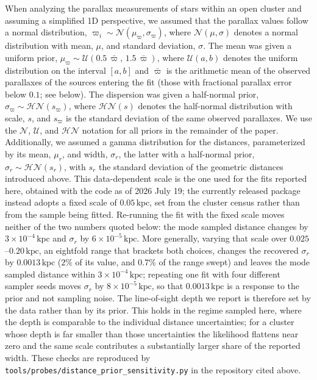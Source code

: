 \documentclass{aa}
\begin{document}
When analyzing the parallax measurements of stars within an open cluster and assuming a simplified 1D perspective, we assumed that the parallax values follow a normal distribution, $\varpi_i \sim \mathcal{N}(\mu_\varpi,\sigma_\varpi)$, where $\mathcal{N}(\mu,\sigma)$ denotes a normal distribution with mean, $\mu$, and standard deviation, $\sigma$. The mean was given a uniform prior, $\mu_\varpi \sim \mathcal{U}(0.5\,\bar{\varpi},\,1.5\,\bar{\varpi})$, where $\mathcal{U}(a,b)$ denotes the uniform distribution on the interval $[a,b]$ and $\bar{\varpi}$ is the arithmetic mean of the observed parallaxes of the sources entering the fit (those with fractional parallax error below $0.1$; see below). The dispersion was given a half-normal prior, $\sigma_\varpi \sim \mathcal{HN}(s_\varpi)$, where $\mathcal{HN}(s)$ denotes the half-normal distribution with scale, $s$, and $s_\varpi$ is the standard deviation of the same observed parallaxes. We use the $\mathcal{N}$, $\mathcal{U}$, and $\mathcal{HN}$ notation for all priors in the remainder of the paper. Additionally, we assumed a gamma distribution for the distances, parameterized by its mean, $\mu_r$, and width, $\sigma_r$, the latter with a half-normal prior, $\sigma_r \sim \mathcal{HN}(s_r)$, with $s_r$ the standard deviation of the geometric distances introduced above. This data-dependent scale is the one used for the fits reported here, obtained with the code as of 2026 July 19; the currently released package instead adopts a fixed scale of $0.05\,\mathrm{kpc}$, set from the \citet{2024arXiv240305143H} cluster census rather than from the sample being fitted. Re-running the fit with the fixed scale moves neither of the two numbers quoted below: the mode sampled distance changes by $3\times10^{-4}\,\mathrm{kpc}$ and $\sigma_r$ by $6\times10^{-5}\,\mathrm{kpc}$. More generally, varying that scale over $0.025$--$0.20\,\mathrm{kpc}$, an eightfold range that brackets both choices, changes the recovered $\sigma_r$ by $0.0013\,\mathrm{kpc}$ ($2\%$ of its value, and $0.7\%$ of the range swept) and leaves the mode sampled distance within $3\times10^{-4}\,\mathrm{kpc}$; repeating one fit with four different sampler seeds moves $\sigma_r$ by $8\times10^{-5}\,\mathrm{kpc}$, so that $0.0013\,\mathrm{kpc}$ is a response to the prior and not sampling noise. The line-of-sight depth we report is therefore set by the data rather than by its prior. This holds in the regime sampled here, where the depth is comparable to the individual distance uncertainties; for a cluster whose depth is far smaller than those uncertainties the likelihood flattens near zero and the same scale contributes a substantially larger share of the reported width. These checks are reproduced by \texttt{tools/probes/distance\_prior\_sensitivity.py} in the repository cited above.
\end{document}
